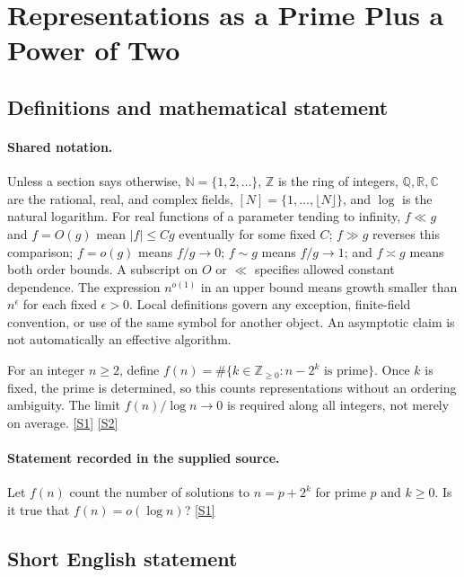 \documentclass[11pt,a4paper]{article}
\newcommand{\N}{\mathbb{N}}
\newcommand{\Z}{\mathbb{Z}}
\newcommand{\Q}{\mathbb{Q}}
\newcommand{\R}{\mathbb{R}}
\newcommand{\C}{\mathbb{C}}
\newcommand{\sref}[2]{\hyperlink{source:#1:#2}{[S#2]}}
\begin{document}
\section{Representations as a Prime Plus a Power of Two}\label{statement}


\subsection{Definitions and mathematical statement}

\paragraph{Shared notation.}Unless a section says otherwise, $\N=\{1,2,\ldots\}$,
$\Z$ is the ring of integers, $\Q,\R,\C$ are the rational, real, and complex
fields, $[N]=\{1,\ldots,\lfloor N\rfloor\}$, and $\log$ is the natural
logarithm. For real functions of a parameter tending to infinity,
$f\ll g$ and $f=O(g)$ mean $|f|\leq Cg$ eventually for some fixed $C$;
$f\gg g$ reverses this comparison; $f=o(g)$ means $f/g\to0$;
$f\sim g$ means $f/g\to1$; and $f\asymp g$ means both order bounds.
A subscript on $O$ or $\ll$ specifies allowed constant dependence.
The expression $n^{o(1)}$ in an upper bound means growth smaller than
$n^\epsilon$ for each fixed $\epsilon>0$. Local definitions govern any
exception, finite-field convention, or use of the same symbol for another
object. An asymptotic claim is not automatically an effective algorithm.



For an integer $n\geq2$, define $f(n)=\#\{k\in\Z_{\geq0}:n-2^k\text{ is prime}\}$. Once $k$ is fixed, the prime is determined, so this counts representations without an ordering ambiguity. The limit $f(n)/\log n\to0$ is required along all integers, not merely on average. \sref{statement}{1} \sref{statement}{2}

\paragraph{Statement recorded in the supplied source.}
Let $f(n)$ count the number of solutions to $n=p+2^k$ for prime $p$ and $k\geq 0$. Is it true that $f(n)=o(\log n)$? \sref{statement}{1}

\subsection{Short English statement}
\end{document}
